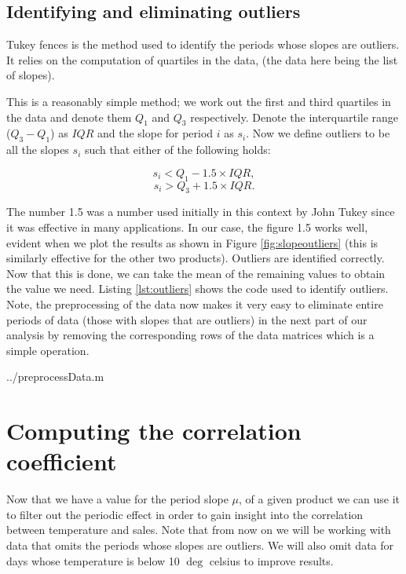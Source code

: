 \subsection{Identifying and eliminating outliers}

Tukey fences \cite{tukey} is the method used to identify the periods whose slopes are outliers.  It relies on the computation of quartiles in the data, (the data here being the list of slopes).

This is a reasonably simple method; we work out the first and third quartiles in the data and denote them $Q_1$ and $Q_3$ respectively. Denote the interquartile range ($Q_3 - Q_1$)  as $IQR$ and the slope for period $i$ as $s_i$. Now we define outliers to be all the slopes $s_i$ such that either of the following holds:

$$
s_i < Q_1 - 1.5 \times IQR,
$$
$$
s_i > Q_3 + 1.5 \times IQR .
$$

The number 1.5 was a number used initially in this context by John Tukey \cite{tukey} since it was effective in many applications. In our case, the figure 1.5 works well, evident when we plot the results as shown in Figure \ref{fig:slopeoutliers} (this is similarly effective for the other two products). Outliers are identified correctly. Now that this is done, we can take the mean of the remaining values to obtain the value we need. Listing \ref{lst:outliers} shows the code used to identify outliers. Note, the preprocessing of the data now makes it very easy to eliminate entire periods of data (those with slopes that are outliers) in the next part of our analysis by removing the corresponding rows of the data matrices which is a simple operation.

 {../preprocessData.m}

\section{Computing the correlation coefficient}

Now that we have a value for the period slope $\mu$, of a given product we can use it to filter out the periodic effect in order to gain insight into the correlation between temperature and sales. Note that from now on we will be working with data that omits the periods whose slopes are outliers. We will also omit data for days whose temperature is below 10 $\deg$ celsius to improve results.

